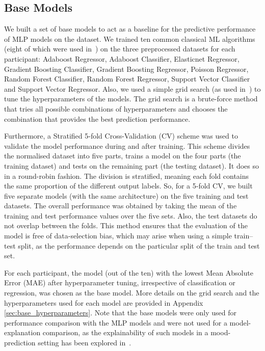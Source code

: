 \subsection{Base Models}
\label{sec:base_model}
We built a set of base models to act as a baseline for the predictive performance of MLP models on the dataset. We trained ten common classical ML algorithms  (eight of which were used in~\cite{shah_personalized_2021}) on the three preprocessed datasets for each participant: Adaboost Regressor, Adaboost Classifier, Elasticnet Regressor, Gradient Boosting Classifier, Gradient Boosting Regressor, Poisson Regressor, Random Forest Classifier, Random Forest Regressor, Support Vector Classifier and Support Vector Regressor. Also, we used a simple grid search (as used in~\cite{shah_personalized_2021}) to tune the hyperparameters of the models. The grid search is a brute-force method that tries all possible combinations of hyperparameters and chooses the combination that provides the best prediction performance. 

Furthermore, a Stratified 5-fold Cross-Validation (CV) scheme was used to validate the model performance during and after training. This scheme divides the normalised dataset into five parts, trains a model on the four parts (the training dataset) and tests on the remaining part (the testing dataset). It does so in a round-robin fashion. The division is stratified, meaning each fold contains the same proportion of the different output labels. So, for a 5-fold CV, we built five separate models (with the same architecture) on the five training and test datasets. The overall performance was obtained by taking the mean of the training and test performance values over the five sets. Also, the test datasets do not overlap between the folds. This method ensures that the evaluation of the model is free of data-selection bias, which may arise when using a simple train--test split, as the performance depends on the particular split of the train and test set. 

For each participant, the model (out of the ten) with the lowest Mean Absolute Error (MAE) after hyperparameter tuning, irrespective of classification or regression, was chosen as the base model. More details on the grid search and the hyperparameters used for each model are provided in Appendix \ref{sec:base_hyperparameters}. Note that the base models were only used for performance comparison with the MLP models and were not used for a model-explanation comparison, as the explainability of such models in a mood-prediction setting has been explored in~\cite{shah_personalized_2021}.


